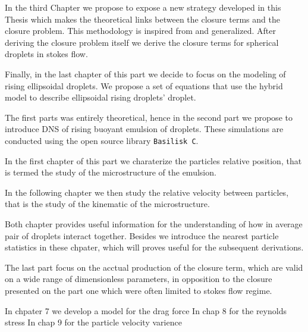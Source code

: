 In the third Chapter we propose to expose a new strategy developed in this Thesis which makes the theoretical links between the closure terms and the closure problem. 
This methodology is inspired from \citet{hinch1977averaged} and generalized.
After deriving the closure problem itself we derive the closure terms for spherical droplets in stokes flow.  

Finally, in the last chapter of this part we decide to focus on the modeling of rising ellipsoidal droplets. 
We propose a set of equations that use the hybrid model to describe ellipsoidal rising droplets' droplet. 





The first parts was entirely theoretical, hence in the second part we propose to introduce DNS of rising buoyant emulsion of droplets. 
These simulations are conducted using the open source library \texttt{Basilisk C}. 

In the first chapter of this part we charaterize the particles relative position, that is termed the study of the microstructure of the emulsion. 

In the following chapter we then study the relative velocity between particles, that is the study of the kinematic of the microstructure. 

Both chapter provides useful information for the understanding of how in average pair of droplets interact together. 
Besides we introduce the nearest particle statistics in these chpater, which will proves useful for the subsequent derivations. 


The last part focus on the acctual production of the closure term, which are valid on a wide range of dimensionless parameters, in opposition to the closure presented on the part one which were often limited to stokes flow regime. 

In chpater 7 we develop a model for the drag force 
In chap 8 for the reynolds stress
In chap 9 for the particle velocity varience 